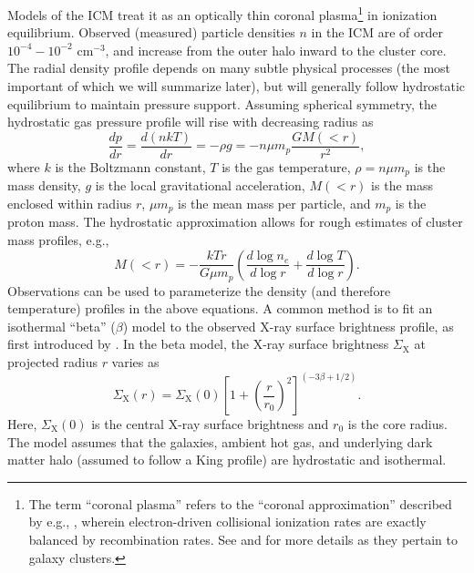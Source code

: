 Models of the ICM treat it as an optically thin coronal plasma\footnote{The term ``coronal plasma'' refers to the ``coronal approximation'' described by e.g., \citet{mewe99}, wherein 
electron-driven collisional ionization rates are exactly balanced by recombination rates. 
See \citet{sarazin86} and \citet{peterson06} for more details as they pertain to galaxy clusters.} in ionization equilibrium. 
Observed (measured) particle densities $n$ in the ICM are of order $10^{-4}-10^{-2}$
cm$^{-3}$, and increase from the outer halo inward to the cluster core. 
The radial density profile depends on many subtle physical processes (the most important of which 
we will summarize later), but will generally follow hydrostatic equilibrium to maintain pressure support. 
Assuming spherical symmetry, the hydrostatic gas pressure profile will rise with decreasing radius as 
\begin{equation}
\frac{dp}{dr} = \frac{d\left(nkT\right)}{dr} = - \rho g  = -n \mu m_p \frac{G M\left(<r\right)}{r^2},
\end{equation} 
where $k$ is the Boltzmann constant, $T$ is the gas temperature, $\rho=n \mu m_p  $ is the mass density, $g$ is the local gravitational 
acceleration, $M\left(<r\right)$ is the mass enclosed within radius $r$, $\mu m_p$ is the mean mass per particle, 
and $m_p$ is the proton mass. The hydrostatic approximation allows for rough estimates of cluster mass profiles, e.g., 
\begin{equation}
M\left(<r\right) = -\frac{kTr}{G \mu m_p} \left( \frac{d \log n_e}{d \log r} + \frac{d \log T}{d \log r} \right).
\end{equation}
Observations can be used to parameterize the density (and therefore temperature) profiles in the above equations. 
A common method is to fit an isothermal ``beta'' ($\beta$) model to the observed X-ray surface brightness profile, 
as first introduced by \citet{cavaliere76,branduardi81,forman82}. 
In the beta model, the X-ray surface brightness $\Sigma_\mathrm{X}$ at projected radius
$r$ varies as 
\begin{equation} 
\Sigma_\mathrm{X}\left(r\right) =
\Sigma_{\mathrm{X}}\left(0\right) \left[ 1 + \left(\frac{r}{r_0}\right)^2\right]^{\left(-3
\beta + 1/2\right)}. 
\end{equation} 
Here, $\Sigma_{\mathrm{X}}\left(0\right)$ is the central
X-ray surface brightness and $r_0$ is the core radius.  The model assumes that
the galaxies, ambient hot gas, and underlying dark matter halo (assumed to follow a King profile) are hydrostatic and isothermal. 
